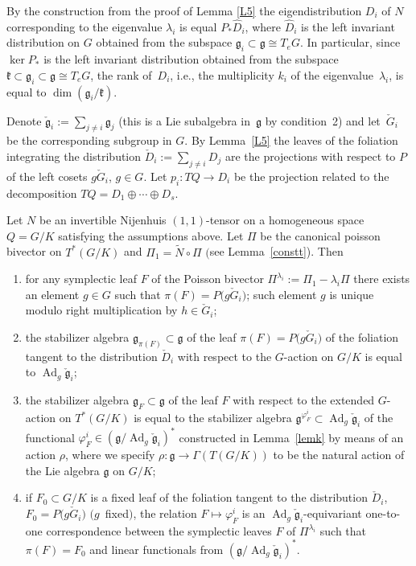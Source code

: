 By the construction from the proof of Lemma \ref{L5} the eigendistribution $D_i$ of $N$ corresponding to the eigenvalue $\lambda_i$ is equal $P_*\widehat D_i$, where $\widehat D_i$ is the left invariant distribution on $G$ obtained from the subspace $\mathfrak{g}_i \subset\mathfrak{g}\cong T_eG$. In particular, since $\ker P_*$ is the left invariant distribution obtained from the subspace $\mathfrak{k} \subset\mathfrak{g}_i \subset\mathfrak{g}\cong T_eG$, the rank of~$D_i$, i.e., the multiplicity $k_i$ of the eigenvalue~$\lambda_i$, is equal to $\dim (\mathfrak{g}_i/\mathfrak{k})$.

Denote $\check{\mathfrak{g}}_i:=\sum\limits_{j\not=i}\mathfrak{g}_j$ (this is a Lie subalgebra in~$\mathfrak{g}$ by condition~2) and let~$\check G_i$ be the corresponding subgroup in $G$. By Lemma~\ref{L5} the leaves of the foliation integrating the distribution
$\check D_i:=\sum\limits_{j\not=i}D_j$ are the projections with respect to $P$ of the left cosets $g \check G_i$, $g\in G$. Let $p_i\colon TQ\to D_i$ be the projection related to the decomposition $TQ=D_1\oplus\cdots\oplus D_s$.

\begin{Lemma}\label{stab}Let $N$ be an invertible Nijenhuis $(1,1)$-tensor on a homogeneous space $Q=G/K$ satisfying the assumptions above. Let $\Pi$ be the canonical poisson bivector on $T^*(G/K)$ and $\Pi_1=\widetilde{N}\circ\Pi$ $($see Lemma~{\rm \ref{constt})}. Then
 \begin{enumerate}\itemsep=0pt
 \item[$1)$] for any symplectic leaf $F$ of the Poisson bivector $\Pi^{\lambda_i}:=\Pi_1-\lambda_i\Pi$ there exists an element $g\in G$ such that $\pi(F)=P\big(g\check G_i\big)$; such element $g$ is unique modulo right multiplication by $h\in\check G_i$;
 \item[$2)$] the stabilizer algebra $\mathfrak{g}_{\pi(F)} \subset\mathfrak{g}$ of the leaf $\pi(F)=P\big(g\check G_i\big)$ of the foliation tangent to the distribution $\check D_i$ with respect to the $G$-action on $G/K$ is equal to $\operatorname{Ad}_g\check{\mathfrak{g}}_i$;
 \item[$3)$] the stabilizer algebra $\mathfrak{g}_{F} \subset\mathfrak{g}$ of the leaf $F$ with respect to the extended $G$-action on $T^*(G/K)$ is equal to the stabilizer algebra $\mathfrak{g}^{\varphi_F^i} \subset\operatorname{Ad}_g\check{\mathfrak{g}}_i$ of the functional $\varphi_F^i\in(\mathfrak{g}/\operatorname{Ad}_g\check{\mathfrak{g}}_i)^*$ constructed in Lemma~{\rm \ref{lemk}} by means of an action $\rho$, where we specify $\rho\colon \mathfrak{g}\to\Gamma(T(G/K))$ to be the natural action of the Lie algebra $\mathfrak{g}$ on $G/K$;
 \item[$4)$] if $F_0 \subset G/K$ is a fixed leaf of the foliation tangent to the distribution $\check D_i$, $F_0=P\big(g\check G_i\big)$ $(g$~fixed$)$, the relation $F\mapsto\varphi_F^i$ is an $\operatorname{Ad}_g\check{\mathfrak{g}}_i$-equivariant one-to-one correspondence between the symplectic leaves $F$ of $\Pi^{\lambda_i}$ such that $\pi(F)=F_0$ and linear functionals from $(\mathfrak{g}/\operatorname{Ad}_g\check{\mathfrak{g}}_i)^*$.
 \end{enumerate}
\end{Lemma}

